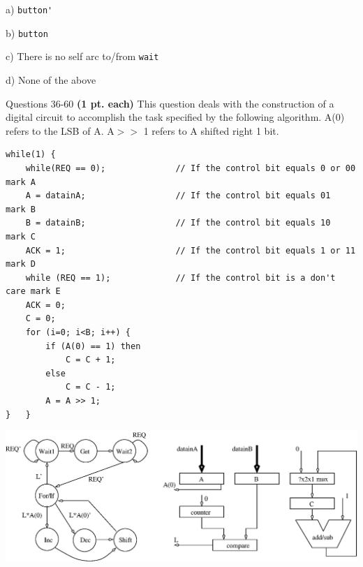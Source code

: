 \documentclass{article}
\begin{document}
\begin{enumerate}
\begin{description}
\item{a) } \verb+button'+
\item{b) } \verb+button+
\item{c) } There is no self arc to/from \verb+wait+
\item{d) } None of the above
\end{description}


\pagebreak
Questions 36-60 {\bf (1 pt. each)} This question deals with the construction 
of a digital circuit to accomplish the task specified by the following 
algorithm.  A(0) refers to the LSB of A.  A$>>$ 1 refers to A shifted right 
1 bit.

{\small
\begin{verbatim}
while(1) {
    while(REQ == 0);              // If the control bit equals 0 or 00  mark A 
    A = datainA;                  // If the control bit equals 01       mark B 
    B = datainB;                  // If the control bit equals 10       mark C 
    ACK = 1;                      // If the control bit equals 1 or 11  mark D 
    while (REQ == 1);             // If the control bit is a don't care mark E 
    ACK = 0;
    C = 0;
    for (i=0; i<B; i++) {
        if (A(0) == 1) then
            C = C + 1;
        else 
            C = C - 1;
        A = A >> 1;
}   } 
\end{verbatim}}

\scalebox{0.7} {\includegraphics{./Fig3/dp&cu.eps}}


\end{enumerate}
\end{document}
